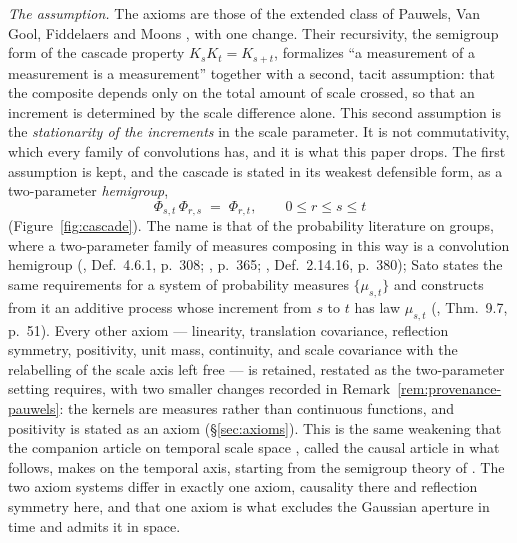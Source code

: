 \emph{The assumption.} The axioms are those of the extended class of Pauwels, Van Gool,
Fiddelaers and Moons , with one change. Their recursivity, the
semigroup form of the cascade property $K_sK_t = K_{s+t}$, formalizes ``a measurement of a
measurement is a measurement'' together with a second, tacit assumption: that the composite
depends only on the total amount of scale crossed, so that an increment is determined by
the scale difference alone. This second assumption is the \emph{stationarity of the
increments} in the scale parameter. It is not commutativity, which every family of
convolutions has, and it is what this paper drops. The first assumption is kept, and the
cascade is stated in its weakest defensible form, as a two-parameter \emph{hemigroup},
\[
  \Phi_{s,t}\,\Phi_{r,s} \;=\; \Phi_{r,t}, \qquad 0 \le r \le s \le t
\]
(Figure~\ref{fig:cascade}). The name is that of the probability literature on groups, where
a two-parameter family of measures composing in this way is a convolution hemigroup
(, Def.~4.6.1, p.~308; ,
p.~365; , Def.~2.14.16, p.~380); Sato states the same
requirements for a system of probability measures $\{\mu_{s,t}\}$ and constructs from it
an additive process whose increment from $s$ to $t$ has law $\mu_{s,t}$
(, Thm.~9.7, p.~51). Every other axiom --- linearity, translation covariance, reflection symmetry, positivity,
unit mass, continuity, and scale covariance with the relabelling of the scale axis left free
--- is retained, restated as the two-parameter setting requires, with two smaller changes
recorded in Remark~\ref{rem:provenance-pauwels}: the kernels are measures rather than
continuous functions, and positivity is stated as an axiom (\S\ref{sec:axioms}).
This is the same weakening that the companion article on temporal scale space
, called the causal article in what follows, makes on the
temporal axis,
starting from the semigroup theory of .
The two axiom systems differ in exactly one axiom, causality there and reflection symmetry
here, and that one axiom is what excludes the Gaussian aperture in time and admits it in
space.



